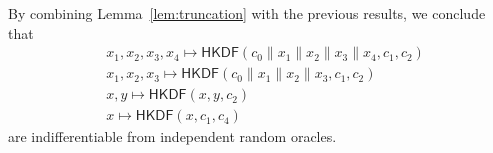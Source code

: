 \documentclass[compsoc, conference, letterpaper, 10pt, times]{IEEEtran}
\newcommand{\HKDF}{\mathsf{HKDF}}
\begin{document}
By combining Lemma~\ref{lem:truncation} with the previous results,
we conclude that 
\begin{align*}
&x_1,x_2,x_3,x_4 \mapsto \HKDF(c_0 \| x_1 \| x_2 \| x_3 \| x_4, c_1, c_2)\\
&x_1,x_2,x_3 \mapsto \HKDF(c_0 \| x_1 \| x_2 \| x_3, c_1, c_2)\\
&x,y \mapsto \HKDF(x,y,c_2)\\
&x \mapsto \HKDF(x,c_1,c_4)
\end{align*} 
are indifferentiable from independent random oracles.



\end{document}
